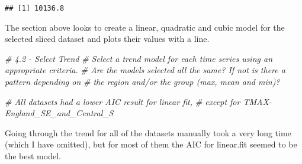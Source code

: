 \documentclass[
]{article}
\newenvironment{Shaded}{\begin{snugshade}}{\end{snugshade}}
\newcommand{\CommentTok}[1]{\textcolor[rgb]{0.56,0.35,0.01}{\textit{#1}}}
\begin{document}
\begin{verbatim}
## [1] 10136.8
\end{verbatim}

The section above looks to create a linear, quadratic and cubic model
for the selected sliced dataset and plots their values with a line.

\begin{Shaded}
\begin{Highlighting}[]
\CommentTok{\# 4.2 {-} Select Trend}
\CommentTok{\# Select a trend model for each time series using an appropriate criteria. }
\CommentTok{\# Are the models selected all the same? If not is there a pattern depending on }
\CommentTok{\# the region and/or the group (max, mean and min)?}

\CommentTok{\# All datasets had a lower AIC result for linear fit,}
\CommentTok{\# except for TMAX{-}England\_SE\_and\_Central\_S}
\end{Highlighting}
\end{Shaded}

Going through the trend for all of the datasets manually took a very
long time (which I have omitted), but for most of them the AIC for
linear.fit seemed to be the best model.
\end{document}
